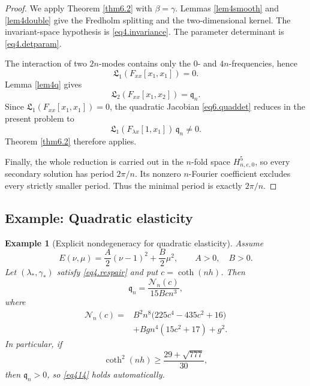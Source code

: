 \documentclass[12pt]{article}
\newtheorem{example}[thm]{Example}
\numberwithin{equation}{section}
\numberwithin{equation}{section}
\begin{document}
\begin{proof}
We apply Theorem \ref{thm6.2} with $\beta=\gamma$.  Lemmas
\ref{lem4smooth} and \ref{lem4double} give the Fredholm splitting and the
two-dimensional kernel.  The invariant-space hypothesis is
\eqref{eq4.invariance}.  The parameter determinant is \eqref{eq4.detparam}.

The interaction of two $2n$-modes contains only the $0$- and $4n$-frequencies, hence
\[
\mathfrak L_1(F_{xx}[x_1,x_1])=0.
\]
Lemma \ref{lem4q} gives
\[
\mathfrak L_2(F_{xx}[x_1,x_2])=\mathfrak q_n.
\]
Since $\mathfrak L_1(F_{xx}[x_1,x_1])=0$, the quadratic Jacobian
\eqref{eq6.quaddet} reduces in the present problem to
\[
\mathfrak L_1(F_{\lambda x}[1,x_1])\,\mathfrak q_n\neq0.
\]
Theorem \ref{thm6.2} therefore applies.

Finally, the whole reduction is carried out in the $n$-fold space
$H^5_{n,e,0}$, so every secondary solution has period $2\pi/n$.  Its nonzero
$n$-Fourier coefficient excludes every strictly smaller period.  Thus the minimal period is
exactly $2\pi/n$.
\end{proof}

\subsection{Example: Quadratic elasticity}

\begin{example}[Explicit nondegeneracy for quadratic elasticity]\label{cor4quadratic}
Assume
\begin{equation}\label{eq4.quadE}
E(\nu,\mu)
=
\frac A2(\nu-1)^2+\frac B2\mu^2,
\qquad A>0,\quad B>0.
\end{equation}
Let $(\lambda_*,\gamma_*)$ satisfy \eqref{eq4.respair} and put $c=\coth(nh)$.
Then
\begin{equation}\label{eq4.qquad}
\mathfrak q_n
=
\frac{\mathcal N_n(c)}{15Bcn^3},
\end{equation}
where
\begin{align}\label{eq4.Nquad}
\mathcal N_n(c)
={}&
B^2n^8\bigl(225c^4-435c^2+16\bigr)
\nonumber\\
&+Bgn^4(15c^2+17)+g^2.
\end{align}
In particular, if
\begin{equation}\label{eq4.depthcond}
\coth^2(nh)
\ge
\frac{29+\sqrt{777}}{30},
\end{equation}
then $\mathfrak q_n>0$, so \eqref{eq414} holds automatically.
\end{example}
\end{document}

